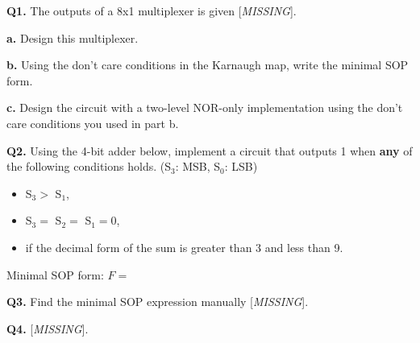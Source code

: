 \documentclass[12pt]{article}
\begin{document}
\noindent
\textbf{Q1.} The outputs of a 8x1 multiplexer is given [\textit{MISSING}].

\hfill

\noindent \textbf{a.} Design this multiplexer.

\vspace{15em}

\noindent \textbf{b.} Using the don't care conditions in the Karnaugh map, write the minimal SOP form.

\vspace{5em}

\noindent \textbf{c.} Design the circuit with a two-level NOR-only implementation using the don't care conditions you used in part b.

\newpage

\noindent \textbf{Q2.} Using the 4-bit adder below, implement a circuit that outputs 1 when \textbf{any} of the following conditions holds. (S$_3$: MSB, S$_0$: LSB)

\begin{itemize}
    \item S$_3>$ S$_1$,
    \item S$_3=$ S$_2 =$ S$_1=0$,
    \item if the decimal form of the sum is greater than 3 and less than 9.
\end{itemize}

\hfill


\hfill

\noindent Minimal SOP form: $F=$

\newpage

\noindent \textbf{Q3.} Find the minimal SOP expression manually [\textit{MISSING}].

\vspace{20em}

\noindent \textbf{Q4.} [\textit{MISSING}].
\end{document}
